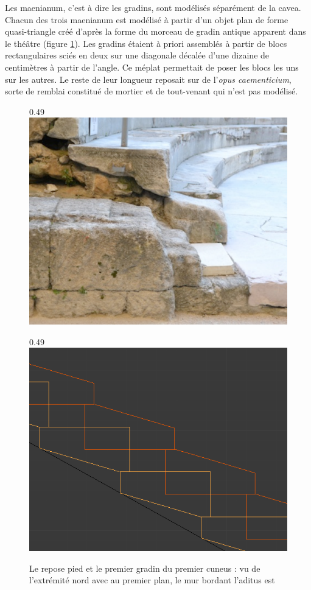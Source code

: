 Les maenianum, c'est à dire les gradins, sont modélisés séparément de la cavea. Chacun des trois maenianum est modélisé à partir d'un objet plan de forme quasi-triangle créé d'après la forme du morceau de gradin antique apparent dans le théâtre (figure \ref{coupeGradin}). Les gradins étaient à priori assemblés à partir de blocs rectangulaires sciés en deux sur une diagonale décalée d'une dizaine de centimètres à partir de l'angle. Ce méplat permettait de poser les blocs les uns sur les autres. Le reste de leur longueur reposait sur de l'\textit{opus caementicium}, sorte de remblai constitué de mortier et de tout-venant qui n'est pas modélisé. 

\begin{figure}[!h] 
	\begin{subfigureth}{0.49\textwidth}
		\includegraphics[scale=0.3]{images/gradinCoupe}
		\caption[Repose pied et premier gradin du premier \gls{cuneus}]{Le repose pied et le premier gradin du premier \gls{cuneus} : vu de l'extrémité nord avec au premier plan, le mur bordant l'\gls{aditus} est} 
		\label{coupeGradin} 		
	\end{subfigureth}	
	\begin{subfigureth}{0.49\textwidth}
		\includegraphics[scale=0.3]{images/escaliers}

\end{subfigureth}
\end{figure}
